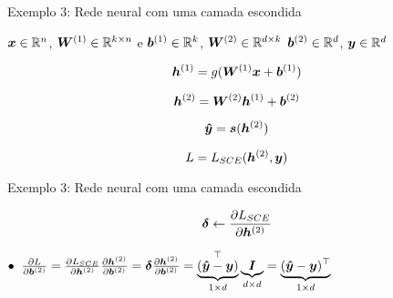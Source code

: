 \documentclass[10pt]{beamer}
\begin{document}
\begin{frame}{Exemplo 3: Rede neural com uma camada escondida}
\large{

$\bm{x}\in \mathbb{R}^{n}$, $\bm{W}^{(1)} \in \mathbb{R}^{k\times n}$ e $\bm{b}^{(1)} \in \mathbb{R}^{k}$, $\bm{W}^{(2)} \in \mathbb{R}^{d\times k}$  $\bm{b}^{(2)} \in \mathbb{R}^{d}$,  $\bm{y} \in \mathbb{R}^{d}$

\vspace{0.1 cm}

\begin{equation*}
\bm{h}^{(1)} = g(\bm{W}^{(1)}\bm{x} + \bm{b}^{(1)})
\end{equation*}

\begin{equation*}
\bm{h}^{(2)} = \bm{W}^{(2)}\bm{h}^{(1)} + \bm{b}^{(2)}
\end{equation*}

\begin{equation*}
\bm{\hat{y}} = \bm{s}(\bm{h}^{(2)})
\end{equation*}

\begin{equation*}
L = L_{SCE}(\bm{h}^{(2)}, \bm{y})
\end{equation*}
}
\end{frame}

\begin{frame}{Exemplo 3: Rede neural com uma camada escondida}
\large{


\begin{equation*}
\bm{\delta} \leftarrow \frac{\partial L_{SCE}}{\partial \bm{h}^{(2)}}
\end{equation*}

\vspace{0.5 cm}
 $\bullet \; \; \frac{\partial L}{\partial \bm{b}^{(2)}} = \frac{\partial L_{SCE}}{\partial \bm{h}^{(2)}}\frac{\partial \bm{h}^{(2)}}{\partial \bm{b}^{(2)}} = \bm{\delta} \frac{\partial \bm{h}^{(2)}}{\partial \bm{b}^{(2)}} =  \underbrace{(\bm{\hat{y}} - \bm{y})}^{\top}_{\tiny{1 \times d}} \underbrace{\bm{I}}_{\tiny{d \times d}} = \underbrace{(\bm{\hat{y}} - \bm{y})^{\top}}_{\tiny{1 \times d}}$
}
\end{frame}
\end{document}

